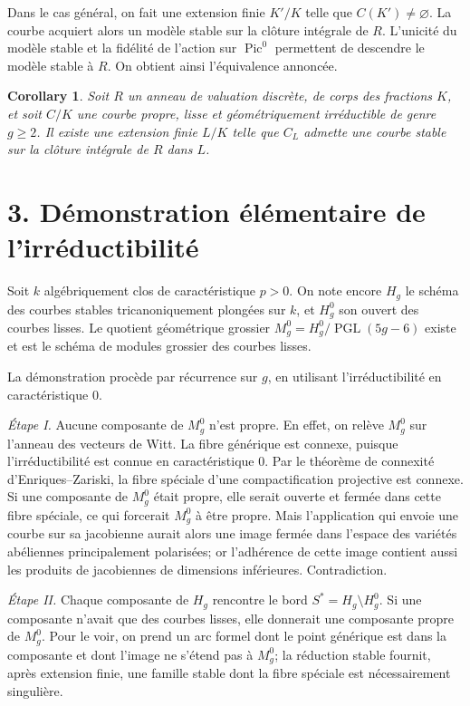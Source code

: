 \documentclass[11pt]{article}
\DeclareMathOperator{\Pic}{Pic}
\DeclareMathOperator{\PGL}{PGL}
\theoremstyle{plain}
\newtheorem*{corollary*}{Corollary}
\theoremstyle{definition}
\theoremstyle{remark}
\begin{document}
Dans le cas général, on fait une extension finie \(K'/K\) telle que \(C(K')\ne\varnothing\). La courbe acquiert alors un modèle stable sur la clôture intégrale de \(R\). L'unicité du modèle stable et la fidélité de l'action sur \(\Pic^0\) permettent de descendre le modèle stable à \(R\). On obtient ainsi l'équivalence annoncée.

\begin{corollary*}
Soit \(R\) un anneau de valuation discrète, de corps des fractions \(K\), et soit \(C/K\) une courbe propre, lisse et géométriquement irréductible de genre \(g\geq 2\). Il existe une extension finie \(L/K\) telle que \(C_L\) admette une courbe stable sur la clôture intégrale de \(R\) dans \(L\).
\end{corollary*}

\section*{3. Démonstration élémentaire de l'irréductibilité}

Soit \(k\) algébriquement clos de caractéristique \(p>0\). On note encore \(H_g\) le schéma des courbes stables tricanoniquement plongées sur \(k\), et \(H_g^0\) son ouvert des courbes lisses. Le quotient géométrique grossier \(M_g^0=H_g^0/\PGL(5g-6)\) existe et est le schéma de modules grossier des courbes lisses.

La démonstration procède par récurrence sur \(g\), en utilisant l'irréductibilité en caractéristique \(0\).

\emph{Étape I.} Aucune composante de \(M_g^0\) n'est propre. En effet, on relève \(M_g^0\) sur l'anneau des vecteurs de Witt. La fibre générique est connexe, puisque l'irréductibilité est connue en caractéristique \(0\). Par le théorème de connexité d'Enriques--Zariski, la fibre spéciale d'une compactification projective est connexe. Si une composante de \(M_g^0\) était propre, elle serait ouverte et fermée dans cette fibre spéciale, ce qui forcerait \(M_g^0\) à être propre. Mais l'application qui envoie une courbe sur sa jacobienne aurait alors une image fermée dans l'espace des variétés abéliennes principalement polarisées; or l'adhérence de cette image contient aussi les produits de jacobiennes de dimensions inférieures. Contradiction.

\emph{Étape II.} Chaque composante de \(H_g\) rencontre le bord \(S^*=H_g\setminus H_g^0\). Si une composante n'avait que des courbes lisses, elle donnerait une composante propre de \(M_g^0\). Pour le voir, on prend un arc formel dont le point générique est dans la composante et dont l'image ne s'étend pas à \(M_g^0\); la réduction stable fournit, après extension finie, une famille stable dont la fibre spéciale est nécessairement singulière.
\end{document}
